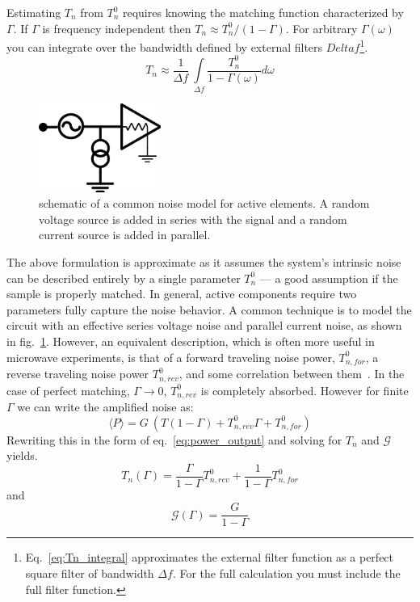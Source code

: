 Estimating $T_n$ from $T_n^0$ requires knowing the matching function characterized by $\Gamma$. If $\Gamma$ is frequency independent then $T_n \approx T_n^0 / (1-\Gamma)$. For arbitrary $\Gamma(\omega)$ you can integrate over the bandwidth defined by external filters $Delta f$\footnote{Eq.~\ref{eq:Tn_integral} approximates the external filter function as a perfect square filter of bandwidth $\Delta f$. For the full calculation you must include the full filter function.}.
\begin{equation}\label{eq:Tn_integral}
T_n \approx \frac{1}{\Delta f}\ \int\limits_{\Delta f}\frac{T_n^0}{1-\Gamma(\omega)}d\omega
\end{equation}
\begin{figure}
\centering
\includegraphics[width=40mm]{figures/Johnson_noise_thermometry/schematic_noise_IV.png}
\caption{schematic of a common noise model for active elements. A random voltage source is added in series with the signal and a random current source is added in parallel.}
\label{fig:schematic_noise_IV}
\end{figure}

The above formulation is approximate as it assumes the system's intrinsic noise can be described entirely by a single parameter $T_n^0$ --- a good assumption if the sample is properly matched. In general, active components require two parameters fully capture the noise behavior. A common technique is to model the circuit with an effective series voltage noise and parallel current noise, as shown in fig.~\ref{fig:schematic_noise_IV}. However, an equivalent description, which is often more useful in microwave experiments, is that of a forward traveling noise power, $T_{n,for}^0$, a reverse traveling noise power $T_{n,rev}^0$, and some correlation between them~\cite{weinreb's_talk??}. In the case of perfect matching, $\Gamma\rightarrow0$, $T_{n,rev}^0$ is completely absorbed. However for finite $\Gamma$ we can write the amplified noise as:
\begin{equation}\label{eq:P_full}
\langle P\rangle=G\ \left(T(1-\Gamma)+T_{n,rev}^0\Gamma+T_{n,for}^0\right)
\end{equation}
Rewriting this in the form of eq.~\ref{eq:power_output} and solving for $T_n$ and $\mathcal{G}$ yields.
\begin{equation}\label{eq:Tn_effective_full}
T_n(\Gamma)=\frac{\Gamma}{1-\Gamma}T_{n,rev}^0+\frac{1}{1-\Gamma}T_{n,for}^0
\end{equation}
and
\begin{equation}\label{eq:G_effective_full}
\mathcal{G}(\Gamma)=\frac{G}{1-\Gamma}
\end{equation}

